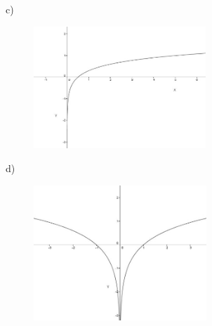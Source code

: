 \documentclass[12pt]{article}
\begin{document}
\begin{enumerate}
\par

c)\par




\begin{figure}[H]
	\begin{Center}
		\includegraphics[width=2.56in,height=1.81in]{./media/image21.jpeg}
	\end{Center}
\end{figure}



\par

d)\par




\begin{figure}[H]
	\begin{Center}
		\includegraphics[width=2.56in,height=2.0in]{./media/image22.jpeg}
	\end{Center}
\end{figure}



\par


\vspace{\baselineskip}

\end{enumerate}
\vspace{\baselineskip}
\end{document}
